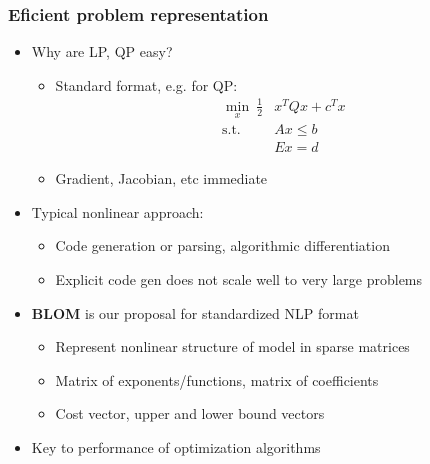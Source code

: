 \documentclass[mathserif]{beamer}
\newcommand{\BLOM}{{\bf BLOM }}
\begin{document}
\begin{frame}
\frametitle{Eficient problem representation}

\begin{itemize}
\item	Why are LP, QP easy?
\begin{itemize}
\item	Standard format, 	e.g. for QP:
\begin{align*} 
\min_x  \ \frac{1}{2} & x^TQx + c^Tx \\ \text{s.t.} \ & A x \leq b \\ & Ex = d  
\end{align*}
\item	Gradient, Jacobian, etc immediate
\end{itemize}
\item Typical nonlinear approach:
\begin{itemize}
\item	Code generation or parsing, algorithmic differentiation
\item	Explicit code gen does not scale well to very large problems
\end{itemize}
\item	\BLOM is our proposal for standardized NLP format
\begin{itemize}
\item	Represent nonlinear structure of model in sparse matrices
\item	Matrix of exponents/functions, matrix of coefficients
\item	Cost vector, upper and lower bound vectors
\end{itemize}
\item 	\alert{Key to performance of optimization algorithms}
\end{itemize}
\end{frame}
\end{document}
